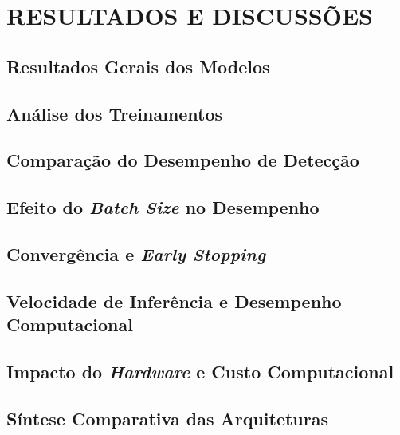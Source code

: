 \chapter{RESULTADOS E DISCUSSÕES}
\label{cap:resultados}

\section{Resultados Gerais dos Modelos}
\label{sec:resultados-gerais}

\section{Análise dos Treinamentos}
\label{sec:analise-treinamentos}

\section{Comparação do Desempenho de Detecção}
\label{sec:comparacao-desempenho}

\section[Efeito do Batch Size no Desempenho]{Efeito do \textit{Batch Size} no Desempenho}
\label{sec:batch-size}

\section[Convergência e Early Stopping]{Convergência e \textit{Early Stopping}}
\label{sec:convergencia-early-stopping}

\section{Velocidade de Inferência e Desempenho Computacional}
\label{sec:velocidade-inferencia}

\section[Impacto do Hardware e Custo Computacional]{Impacto do \textit{Hardware} e Custo Computacional}
\label{sec:impacto-hardware}

\section{Síntese Comparativa das Arquiteturas}
\label{sec:sintese-comparativa}
